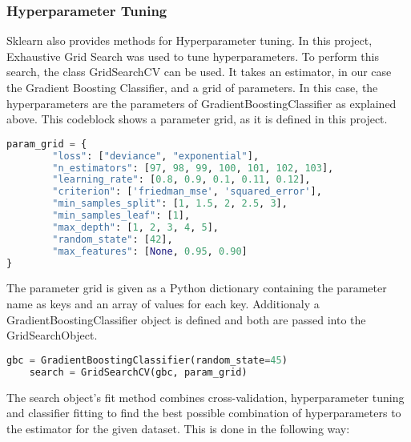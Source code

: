 \subsubsection{Hyperparameter Tuning}

Sklearn also provides methods for Hyperparameter tuning. In this project, Exhaustive Grid Search was used to 
tune hyperparameters. To perform this search, the class GridSearchCV can be used. It takes an 
estimator, in our case the Gradient Boosting Classifier, and a grid of parameters.
In this case, the hyperparameters are the parameters of GradientBoostingClassifier as 
explained above. This codeblock shows a parameter grid, as it is defined in this project.

\begin{lstlisting}[language=Python]
    param_grid = {
        "loss": ["deviance", "exponential"],
        "n_estimators": [97, 98, 99, 100, 101, 102, 103],
        "learning_rate": [0.8, 0.9, 0.1, 0.11, 0.12],
        "criterion": ['friedman_mse', 'squared_error'],
        "min_samples_split": [1, 1.5, 2, 2.5, 3],
        "min_samples_leaf": [1],
        "max_depth": [1, 2, 3, 4, 5],
        "random_state": [42],
        "max_features": [None, 0.95, 0.90]
}
\end{lstlisting}

The parameter grid is given as a Python dictionary containing the parameter name as keys and 
an array of values for each key. Additionaly a GradientBoostingClassifier object is defined 
and both are passed into the GridSearchObject.

\begin{lstlisting}[language=Python]
    gbc = GradientBoostingClassifier(random_state=45)    
    search = GridSearchCV(gbc, param_grid)
\end{lstlisting}

The search object's fit method combines cross-validation, hyperparameter tuning and classifier
fitting to find the best possible combination of hyperparameters to the estimator for the given dataset.
This is done in the following way:

